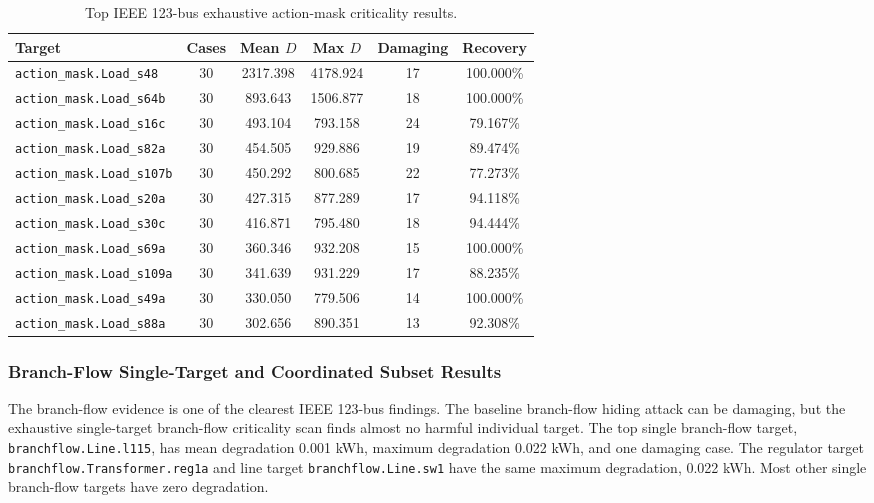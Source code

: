 \begin{table}[t]
\centering
\caption{Top IEEE 123-bus exhaustive action-mask criticality results.}
\label{tab:ieee123_action_mask_criticality}
\scriptsize
\begin{tabular}{lccccc}
\hline
Target & Cases & Mean $D$ & Max $D$ & Damaging & Recovery \\
\hline
\texttt{action\_mask.Load\_s48} & 30 & 2317.398 & 4178.924 & 17 & 100.000\% \\
\texttt{action\_mask.Load\_s64b} & 30 & 893.643 & 1506.877 & 18 & 100.000\% \\
\texttt{action\_mask.Load\_s16c} & 30 & 493.104 & 793.158 & 24 & 79.167\% \\
\texttt{action\_mask.Load\_s82a} & 30 & 454.505 & 929.886 & 19 & 89.474\% \\
\texttt{action\_mask.Load\_s107b} & 30 & 450.292 & 800.685 & 22 & 77.273\% \\
\texttt{action\_mask.Load\_s20a} & 30 & 427.315 & 877.289 & 17 & 94.118\% \\
\texttt{action\_mask.Load\_s30c} & 30 & 416.871 & 795.480 & 18 & 94.444\% \\
\texttt{action\_mask.Load\_s69a} & 30 & 360.346 & 932.208 & 15 & 100.000\% \\
\texttt{action\_mask.Load\_s109a} & 30 & 341.639 & 931.229 & 17 & 88.235\% \\
\texttt{action\_mask.Load\_s49a} & 30 & 330.050 & 779.506 & 14 & 100.000\% \\
\texttt{action\_mask.Load\_s88a} & 30 & 302.656 & 890.351 & 13 & 92.308\% \\
\hline
\end{tabular}
\end{table}

\subsubsection{Branch-Flow Single-Target and Coordinated Subset Results}
\label{subsubsec:ieee123_branchflow}

The branch-flow evidence is one of the clearest IEEE 123-bus findings. The baseline branch-flow hiding attack can be damaging, but the exhaustive single-target branch-flow criticality scan finds almost no harmful individual target. The top single branch-flow target, \texttt{branchflow.Line.l115}, has mean degradation 0.001 kWh, maximum degradation 0.022 kWh, and one damaging case. The regulator target \texttt{branchflow.Transformer.reg1a} and line target \texttt{branchflow.Line.sw1} have the same maximum degradation, 0.022 kWh. Most other single branch-flow targets have zero degradation.

